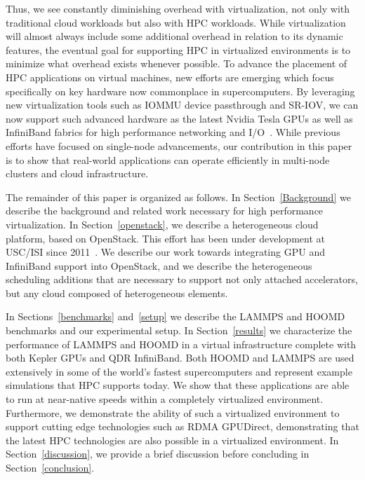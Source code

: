 \documentclass[10pt]{sigplanconf}
\begin{document}
Thus, we see constantly diminishing overhead
with virtualization, not only with traditional cloud workloads
\cite{huber2011evaluating} but also with HPC workloads.  While virtualization
will almost always include some additional overhead in relation to its dynamic
features, the eventual goal for supporting HPC in virtualized environments is to
minimize what overhead exists whenever possible.  To advance the placement of
HPC applications on virtual machines, new efforts are emerging which focus
specifically on key hardware now commonplace in supercomputers. By leveraging
new virtualization tools such as IOMMU device passthrough and SR-IOV, we can now
support such advanced hardware as the latest Nvidia Tesla GPUs
\cite{Walters2014cloud}  as well as InfiniBand fabrics for high performance networking
and I/O~\cite{jose2013sr,Musleh2014cloud}. While previous efforts have
focused on single-node advancements, our contribution in this paper is to show
that real-world applications can operate efficiently in multi-node clusters and cloud
infrastructure.  





The remainder of this paper is organized as follows.  In
Section~\ref{Background} we describe the background and related work necessary for high performance
virtualization. In Section~\ref{openstack}, we describe a heterogeneous cloud platform, based on OpenStack. This
effort has been under development at USC/ISI since 2011~\cite{crago2011heterogeneous}.
We describe our work towards integrating GPU and InfiniBand support into
OpenStack, and we describe the heterogeneous scheduling additions that are
necessary to support not only attached accelerators, but any cloud composed of
heterogeneous elements.  

In Sections~\ref{benchmarks} and~\ref{setup} we describe the LAMMPS and HOOMD
benchmarks and our experimental setup.  In Section~\ref{results} we characterize the
performance of LAMMPS and HOOMD in a virtual infrastructure complete with both
Kepler GPUs and QDR InfiniBand.  Both HOOMD and LAMMPS are used extensively in
some of the world's fastest supercomputers and represent example simulations
that HPC supports today.  We show that these applications are able to run at
near-native speeds within a completely virtualized environment.
Furthermore, we demonstrate the ability of such a virtualized environment to
support cutting edge technologies such as RDMA GPUDirect, demonstrating that the
latest HPC technologies are also possible in a virtualized environment.
In Section~\ref{discussion}, we provide a brief discussion before concluding in
Section~\ref{conclusion}. 
\end{document}
